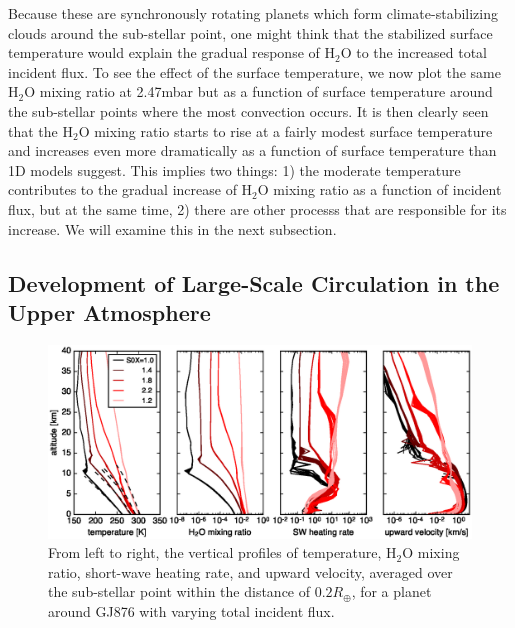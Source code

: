 \documentclass[11pt,numberedappendix,twocolappendix,]{emulateapj}
\def\water{H$_2$O }
\def\preslevel{2.47}
\begin{document}
Because these are synchronously rotating planets which form climate-stabilizing clouds around the sub-stellar point, one might think that the stabilized surface temperature would explain the gradual response of \water to the increased total incident flux. 
To see the effect of the surface temperature, we now plot the same \water mixing ratio at \preslevel mbar but as a function of surface temperature around the sub-stellar points where the most convection occurs. 
It is then clearly seen that the \water mixing ratio starts to rise at a fairly modest surface temperature and increases even more dramatically as a function of surface temperature than 1D models suggest. 
This implies two things: 1) the moderate temperature contributes to the gradual increase of \water mixing ratio as a function of incident flux, but at the same time, 2) there are other processs that are responsible for its increase. 
We will examine this in the next subsection. 

\subsection{Development of Large-Scale Circulation in the Upper Atmosphere}
\label{ss:result_omega}


\begin{figure}[htb]
    \begin{center}
    \includegraphics[width=0.8\hsize]{fig/AqOH0TLS_GJ876_temp_xH2O_vz_heat.eps}
    \end{center}
\caption{From left to right, the vertical profiles of temperature, \water mixing ratio, short-wave heating rate, and upward velocity, averaged over the sub-stellar point within the distance of $0.2R_{\oplus }$, for a planet around GJ876 with varying total incident flux. }                                                                                                             
\label{fig:AqOH0TLS_GJ876_temp_xH2O_vz_heat}
\end{figure}
\end{document}
